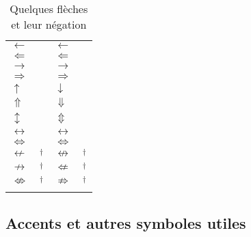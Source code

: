\begin{table}[p]
  \caption{Quelques flèches et leur négation}
  \label{tab:math:fleches}
  \begin{tabularx}{1.0\linewidth}{lXlX}
    $\gets$                & \cmd{\leftarrow}\quad \cmd{\gets} &
    $\longleftarrow$       & \cmd{\longleftarrow}              \\
    $\Leftarrow$           & \cmd{\Leftarrow}                  &
    $\Longleftarrow$       & \cmd{\Longleftarrow}              \\
    $\to$                  & \cmd{\rightarrow}\quad \cmd{\to}  &
    $\longrightarrow$      & \cmd{\longrightarrow}             \\
    $\Rightarrow$          & \cmd{\Rightarrow}                 &
    $\Longrightarrow$      & \cmd{\Longrightarrow}             \\
    $\uparrow$             & \cmd{\uparrow}                    &
    $\downarrow$           & \cmd{\downarrow}                  \\
    $\Uparrow$             & \cmd{\Uparrow}                    &
    $\Downarrow$           & \cmd{\Downarrow}                  \\
    $\updownarrow$         & \cmd{\updownarrow}                &
    $\Updownarrow$         & \cmd{\Updownarrow}                \\
    $\leftrightarrow$      & \cmd{\leftrightarrow}             &
    $\longleftrightarrow$  & \cmd{\longleftrightarrow}         \\
    $\Leftrightarrow$      & \cmd{\Leftrightarrow}             &
    $\Longleftrightarrow$  & \cmd{\Longleftrightarrow}         \\
    $\nleftarrow$          & \cmd{\nleftarrow}$^\dagger$         &
    $\nleftrightarrow$     & \cmd{\nleftrightarrow}$^\dagger$    \\
    $\nrightarrow$         & \cmd{\nrightarrow}$^\dagger$        &
    $\nLeftarrow$          & \cmd{\nLeftarrow}$^\dagger$         \\
    $\nLeftrightarrow$     & \cmd{\nLeftrightarrow}$^\dagger$    &
    $\nRightarrow$         & \cmd{\nRightarrow}$^\dagger$        \\
    \addlinespace
  \end{tabularx}
\end{table}

\subsection{Accents et autres symboles utiles}
\label{sec:math:symboles:autres}

